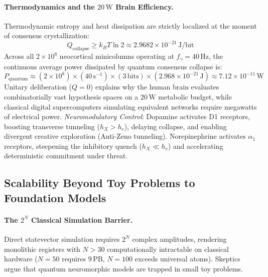 \documentclass[10pt,twocolumn,3p]{article}
\begin{document}
\paragraph{Thermodynamics and the $20\,\text{W}$ Brain Efficiency.}
Thermodynamic entropy and heat dissipation are strictly localized at the moment of consensus crystallization:
\begin{equation}
    Q_{\text{collapse}} \ge k_B T \ln 2 \approx 2.9682 \times 10^{-21}\,\text{J/bit}
\end{equation}
Across all $2 \times 10^8$ neocortical minicolumns operating at $f_\gamma = 40\,\text{Hz}$, the continuous average power dissipated by quantum consensus collapse is:
\begin{equation}
    P_{\text{quantum}} \approx (2 \times 10^8) \times (40\,\text{s}^{-1}) \times (3\,\text{bits}) \times (2.968 \times 10^{-21}\,\text{J}) \approx 7.12 \times 10^{-11}\,\text{W}
\end{equation}
Unitary deliberation ($Q = 0$) explains why the human brain evaluates combinatorially vast hypothesis spaces on a $20\,\text{W}$ metabolic budget, while classical digital supercomputers simulating equivalent networks require megawatts of electrical power.
\textit{Neuromodulatory Control}: Dopamine activates D1 receptors, boosting transverse tunneling ($h_X > h_c$), delaying collapse, and enabling divergent creative exploration (Anti-Zeno tunneling). Norepinephrine activates $\alpha_1$ receptors, steepening the inhibitory quench ($h_X \ll h_c$) and accelerating deterministic commitment under threat.

\subsection{Scalability Beyond Toy Problems to Foundation Models}
\label{subsec:dial_scalability_foundation_models}

\paragraph{The $2^N$ Classical Simulation Barrier.}
Direct statevector simulation requires $2^N$ complex amplitudes, rendering monolithic registers with $N > 30$ computationally intractable on classical hardware ($N=50$ requires $9\,\text{PB}$, $N=100$ exceeds universal atoms). Skeptics argue that quantum neuromorphic models are trapped in small toy problems.
\end{document}
